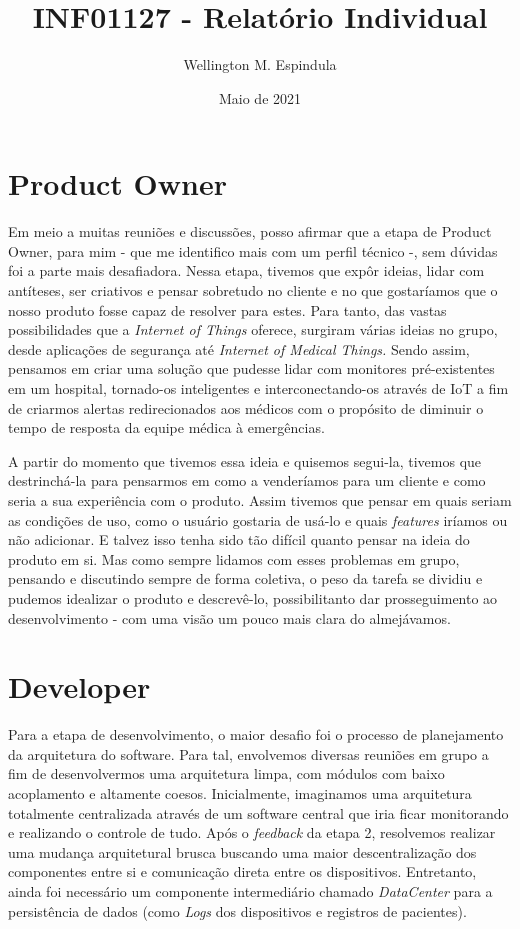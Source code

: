 \documentclass[12pt, a4paper]{article}
\title{INF01127 - Relatório Individual}
\author{Wellington M. Espindula}
\date{Maio de 2021}
\newcommand{\tit}[1]{\textit{#1}}
\newcommand{\ssw}{software }
\begin{document}
    \maketitle
    
    \section{Product Owner}
    Em meio a muitas reuniões e discussões, posso afirmar que a etapa de Product Owner, para mim - que me identifico mais com um perfil técnico -, sem dúvidas foi a parte mais desafiadora. Nessa etapa, tivemos que expôr ideias, lidar com antíteses, ser criativos e pensar sobretudo no cliente e no que gostaríamos que o nosso produto fosse capaz de resolver para estes. Para tanto, das vastas possibilidades que a \tit{Internet of Things} oferece, surgiram várias ideias no grupo, desde aplicações de segurança até \tit{Internet of Medical Things.} Sendo assim, pensamos em criar uma solução que pudesse lidar com monitores pré-existentes em um hospital, tornado-os inteligentes e interconectando-os através de IoT a fim de criarmos alertas redirecionados aos médicos com o propósito de diminuir o tempo de resposta da equipe médica à emergências. 
    
    A partir do momento que tivemos essa ideia e quisemos segui-la, tivemos que destrinchá-la para pensarmos em como a venderíamos para um cliente e como seria a sua experiência com o produto. Assim tivemos que pensar em quais seriam as condições de uso, como o usuário gostaria de usá-lo e quais \tit{features} iríamos ou não adicionar. E talvez isso tenha sido tão difícil quanto pensar na ideia do produto em si. Mas como sempre lidamos com esses problemas em grupo, pensando e discutindo sempre de forma coletiva, o peso da tarefa se dividiu e pudemos idealizar o produto e descrevê-lo, possibilitanto dar prosseguimento ao desenvolvimento - com uma visão um pouco mais clara do almejávamos.
    
    \section{Developer}
    Para a etapa de desenvolvimento, o maior desafio foi o processo de planejamento da arquitetura do software. Para tal, envolvemos diversas reuniões em grupo a fim de desenvolvermos uma arquitetura limpa, com módulos com baixo acoplamento e altamente coesos. Inicialmente, imaginamos uma arquitetura totalmente centralizada através de um \ssw central que iria ficar monitorando e realizando o controle de tudo. Após o \tit{feedback} da etapa 2, resolvemos realizar uma mudança arquitetural brusca buscando uma maior descentralização dos componentes entre si e comunicação direta entre os dispositivos. Entretanto, ainda foi necessário um componente intermediário chamado \tit{DataCenter} para a persistência de dados (como \tit{Logs} dos dispositivos e registros de pacientes). 
    
\end{document}
